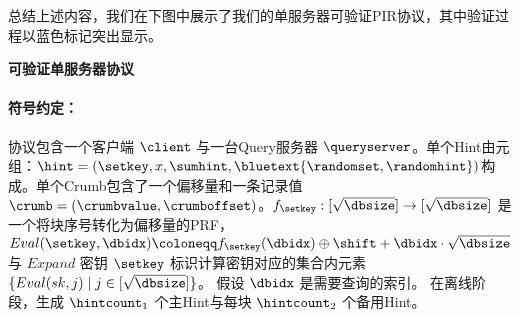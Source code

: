 总结上述内容，我们在下图中展示了我们的单服务器可验证PIR协议，其中验证过程以蓝色标记突出显示。

    \begin{mdframed}
    \centering
    \textbf{可验证单服务器协议}
        \raggedright
        \paragraph{符号约定：} 协议包含一个客户端 $\client$ 与一台Query服务器 $\queryserver$。单个Hint由元组：$\hint=(\setkey,x,\sumhint,\bluetext{\randomset,\randomhint})$构成。单个Crumb包含了一个偏移量和一条记录值 $\crumb=(\crumbvalue, \crumboffset)$。$f_{\setkey}: [\sqrt{\dbsize}]\to [\sqrt{\dbsize}]$ 是一个将块序号转化为偏移量的PRF， $Eval(\setkey,\dbidx) \coloneqq f_{\setkey}(\dbidx)\oplus \shift + \dbidx\cdot\sqrt{\dbsize}$ 与 $Expand$ 密钥 $\setkey$ 标识计算密钥对应的集合内元素 $\{Eval(sk,j) \mid j\in[\sqrt{\dbsize}]\}$。  假设 $\dbidx$ 是需要查询的索引。 在离线阶段，生成 $\hintcount_1$ 个主Hint与每块 $\hintcount_2$ 个备用Hint。


\end{mdframed}
